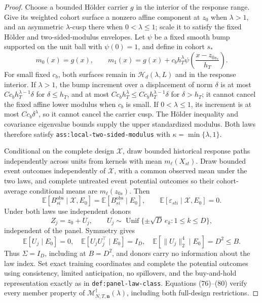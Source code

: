 \documentclass{article}
\begin{document}
\begin{proof}
Choose a bounded H\"older carrier \(g\) in the interior of the response range.  Give its weighted cohort surface a nonzero affine component at \(z_0\) when \(\lambda>1\), and an asymmetric \(\lambda\)-cusp there when \(0<\lambda\leq1\); scale it to satisfy the fixed H\"older and two-sided-modulus envelopes.  Let \(\psi\) be a fixed smooth bump supported on the unit ball with \(\psi(0)=1\), and define in cohort \(s_*\)
\[
m_0(x)=g(x),
\qquad
m_1(x)=g(x)+c_bh_T^\lambda
\psi\!\left(\frac{x-z_{0s_*}}{h_T}\right).
\tag{78}
\]
For small fixed \(c_b\), both surfaces remain in \(\mathcal H_d(\lambda,L)\) and in the response interior.  If \(\lambda>1\), the bump increment over a displacement of norm \(\delta\) is at most
\(Cc_bh_T^{\lambda-1}\delta\) for \(\delta\leq h_T\), and at most
\(Cc_bh_T^\lambda\leq Cc_bh_T^{\lambda-1}\delta\) for \(\delta>h_T\); it cannot cancel the fixed affine lower modulus when \(c_b\) is small.  If \(0<\lambda\leq1\), its increment is at most \(Cc_b\delta^\lambda\), so it cannot cancel the carrier cusp.  The H\"older inequality and covariance eigenvalue bounds supply the upper standardized modulus.  Both laws therefore satisfy \texttt{ass:local-two-sided-modulus} with \(\kappa=\min\{\lambda,1\}\).

Conditional on the complete design \(\mathscr X\), draw bounded historical response paths independently across units from kernels with mean \(m_\ell(X_{st})\).  Draw bounded event outcomes independently of \(\mathscr X\), with a common observed mean under the two laws, and complete untreated event potential outcomes so their cohort-average conditional means are \(m_\ell(z_{0s})\).  Then
\[
\mathbb E[B_{si}^{\mathrm{obs}}\mid\mathscr X,E_0]
=\mathbb E[B_{si}^{\mathrm{obs}}\mid E_0],
\qquad
\mathbb E[\varepsilon_{sti}\mid\mathscr X,E_0]=0.
\tag{79}
\]
Under both laws use independent donors
\[
Z_j=z_0+U_j,
\qquad
U_j\sim\operatorname{Unif}\{\pm\sqrt D\,e_k:1\leq k\leq D\},
\]
independent of the panel.  Symmetry gives
\[
\mathbb E[U_j\mid E_0]=0,
\quad
\mathbb E[U_jU_j^\top\mid E_0]=I_D,
\quad
\mathbb E[\|U_j\|_2^4\mid E_0]=D^2\leq B.
\tag{80}
\]
Thus \(\Sigma=I_D\), including at \(B=D^2\), and donors carry no information about the law index.  Set exact training coordinates and complete the potential outcomes using consistency, limited anticipation, no spillovers, and the buy-and-hold representation exactly as in \texttt{def:panel-law-class}.  Equations (76)--(80) verify every member property of \(\mathcal M_{N,T,\mathbf n}^{\dagger}(\lambda)\), including both full-design restrictions.


\end{proof}
\end{document}
